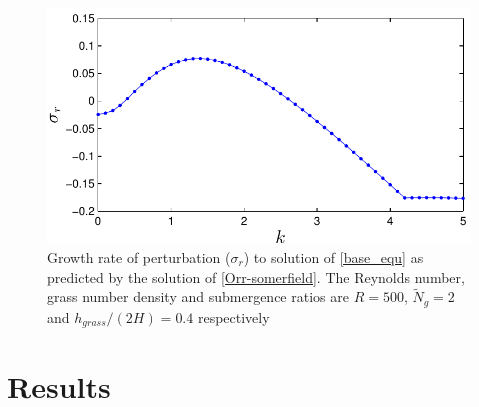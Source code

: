\documentclass[12pt]{report}   %
\newcommand{\Ndg}{\tilde{N}_g}
\begin{document}
\begin{figure}
 \centerline{\includegraphics{GrowthrateVsK}}
 \caption{Growth rate of perturbation ($\sigma_r$) to solution of \eqref{base_equ} as predicted by the solution of \eqref{Orr-somerfield}. The  Reynolds number, grass number density and submergence ratios are $R=500$, $\Ndg=2$ and $h_{grass}/(2H) = 0.4$ respectively }
 \label{GrowthRateVsK}
\end{figure}


%
\clearpage{\pagestyle{empty}\cleardoublepage}

\chapter{Results}
\end{document}
